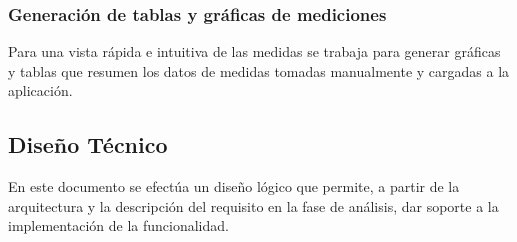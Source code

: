 \documentclass[a4paper,12pt]{article}
\begin{document}
\subsubsection{Generación de tablas y gráficas de mediciones}

Para una vista rápida e intuitiva de las medidas se trabaja para generar gráficas y tablas que resumen los datos de medidas tomadas manualmente y cargadas a la aplicación.

\subsection{Diseño Técnico}
En este documento se efectúa un diseño lógico que permite, a partir de la arquitectura y la descripción del requisito en la fase de análisis, dar soporte a la implementación de la funcionalidad.
\end{document}

